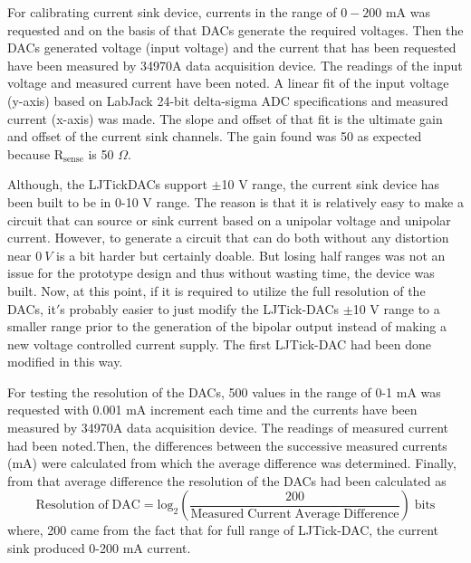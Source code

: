 For calibrating current sink device, currents in the range of $0-200$ mA was requested and on the basis of that DACs generate the required voltages. Then the DACs generated voltage (input voltage) and the current that has been requested have been measured by 34970A data acquisition device. The readings of the input voltage and measured current have been noted. A linear fit of the input voltage (y-axis) based on LabJack 24-bit delta-sigma ADC specifications and measured current (x-axis) was made. The slope and offset of that fit is the ultimate gain and offset of the current sink channels. The gain found was 50 as expected because $\mathrm{R_{sense}}$ is 50 $\Omega$.  

Although, the LJTickDACs support $\pm$10 V range, the current sink device has been built to be in 0-10 V range. The reason is that it is relatively easy to make a circuit that can source or sink current based on a unipolar voltage and unipolar current. However, to generate a circuit that can do both without any distortion near $0\:V$ is a bit harder but certainly doable. But losing half ranges was not an issue for the prototype design and thus without wasting time, the device was built. Now, at this point, if it is required to utilize the full resolution of the DACs,  it$'$s probably easier to just modify the LJTick-DACs $\pm$10 V range to a smaller range prior to the generation of the bipolar output instead of making a new voltage controlled current supply. The first LJTick-DAC had been done modified in this way. 

For testing the resolution of the DACs, 500 values in the range of  0-1 mA was requested with 0.001 mA increment each time and the currents have been measured by 34970A data acquisition device. The readings of measured current had been noted.Then, the differences between the successive measured currents (mA)  were calculated from which the average difference was determined. Finally, from that average difference the resolution of the DACs had been calculated as
\begin{equation}
\mathrm{Resolution\;of\;DAC= log_2\left(\frac{200}{Measured\;Current\;Average\;Difference}\right)\;bits}
\end{equation}
where, 200 came from the fact that for full range of LJTick-DAC, the current sink produced 0-200 mA current.



